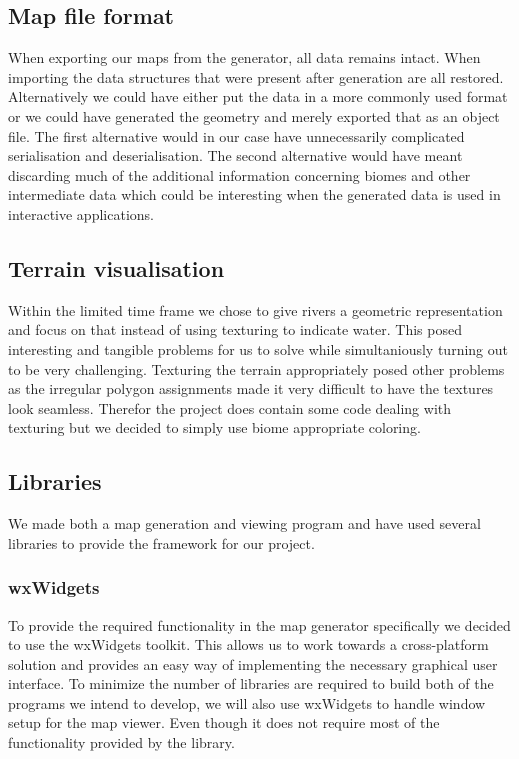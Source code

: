 
\subsection{Map file format}
When exporting our maps from the generator, all data remains intact. When importing the data structures that were present after generation are all restored. Alternatively we could have either put the data in a more commonly used format or we could have generated the geometry and merely exported that as an object file. The first alternative would in our case have unnecessarily complicated serialisation and deserialisation. The second alternative would have meant discarding much of the additional information concerning biomes and other intermediate data which could be interesting when the generated data is used in interactive applications.

\subsection{Terrain visualisation}
Within the limited time frame we chose to give rivers a geometric representation and focus on that instead of using texturing to indicate water. This posed interesting and tangible problems for us to solve while simultaniously turning out to be very challenging. Texturing the terrain appropriately posed other problems as the irregular polygon assignments made it very difficult to have the textures look seamless. Therefor the project does contain some code dealing with texturing but we decided to simply use biome appropriate coloring.

\subsection{Libraries}
We made both a map generation and viewing program and have used several libraries to provide the framework for our project.

\subsubsection{wxWidgets}
To provide the required functionality in the map generator specifically we decided to use the wxWidgets toolkit. This allows us to work towards a cross-platform solution and provides an easy way of implementing the necessary graphical user interface. To minimize the number of libraries are required to build both of the programs we intend to develop, we will also use wxWidgets to handle window setup for the map viewer. Even though it does not require most of the functionality provided by the library.


